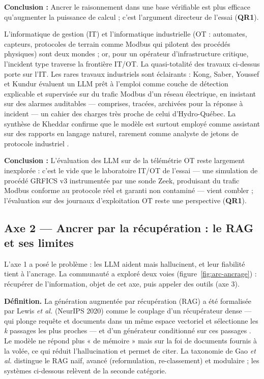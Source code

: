 \begin{encadre}
\textbf{Conclusion :} Ancrer le raisonnement dans une base vérifiable est plus efficace qu'augmenter la puissance de calcul ; c'est l'argument directeur de l'essai (\textbf{QR1}).
\end{encadre}


L'informatique de gestion (IT) et l'informatique industrielle (OT : automates, capteurs, protocoles de terrain comme Modbus qui pilotent des procédés physiques) sont deux mondes ; or, pour un opérateur d'infrastructure critique, l'incident type traverse la frontière IT/OT. La quasi-totalité des travaux ci-dessus porte sur l'IT. Les rares travaux industriels sont éclairants : Kong, Saber, Youssef et Kundur évaluent un LLM prêt à l'emploi comme couche de détection explicable et supervisée sur du trafic Modbus d'un réseau électrique, en insistant sur des alarmes auditables --- comprises, tracées, archivées pour la réponse à incident \cite{kong} --- un cahier des charges très proche de celui d'Hydro-Québec. La synthèse de Kheddar confirme que le modèle est surtout employé comme assistant sur des rapports en langage naturel, rarement comme analyste de jetons de protocole industriel \cite{kheddar}.

\begin{encadre}
\textbf{Conclusion :} L'évaluation des LLM sur de la télémétrie OT reste largement inexplorée : c'est le vide que le laboratoire IT/OT de l'essai --- une simulation de procédé GRFICS v3 instrumentée par une sonde Zeek, produisant du trafic Modbus conforme au protocole réel et garanti non contaminé --- vient combler ; l'évaluation sur des journaux d'exploitation OT reste une perspective (\textbf{QR1}).
\end{encadre}

\FloatBarrier
\subsection{Axe 2 --- Ancrer par la récupération : le RAG et ses limites}\label{sec:axe2}

L'axe 1 a posé le problème : les LLM aident mais hallucinent, et leur fiabilité tient à l'ancrage. La communauté a exploré deux voies (figure~\ref{fig:arc-ancrage}) : récupérer de l'information, objet de cet axe, puis appeler des outils (axe 3).

\textbf{Définition.} La génération augmentée par récupération (RAG) a été formalisée par Lewis \emph{et al.} (NeurIPS 2020) comme le couplage d'un récupérateur dense --- qui plonge requête et documents dans un même espace vectoriel et sélectionne les \emph{k} passages les plus proches --- et d'un générateur conditionné sur ces passages \cite{lewis}. Le modèle ne répond plus « de mémoire » mais sur la foi de documents fournis à la volée, ce qui réduit l'hallucination et permet de citer. La taxonomie de Gao \emph{et al.} distingue le RAG naïf, avancé (reformulation, re-classement) et modulaire \cite{gao} ; les systèmes ci-dessous relèvent de la seconde catégorie.


